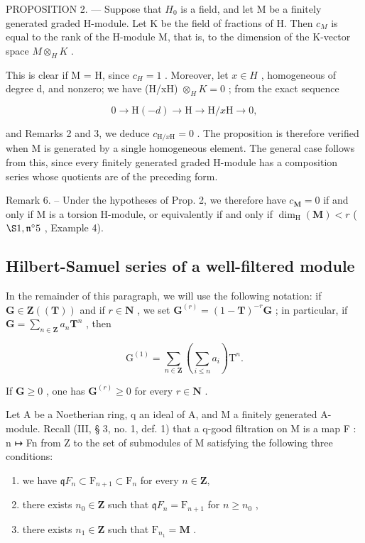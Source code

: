 PROPOSITION 2. --- Suppose that \(H_{0}\) is a field, and let M be a finitely generated graded H-module. Let K be the field of fractions of H. Then \(c_{M}\) is equal to the rank of the H-module M, that is, to the dimension of the K-vector space \(M \otimes_{H} K\) .

This is clear if M = H, since \(c_{H} = 1\) . Moreover, let \(x \in H\) , homogeneous of degree d, and nonzero; we have (H/xH) \(\otimes_{H} K = 0\) ; from the exact sequence

\[
0 \rightarrow \mathrm{H} (- d) \rightarrow \mathrm{H} \rightarrow \mathrm{H} / x \mathrm{H} \rightarrow 0,
\]

and Remarks 2 and 3, we deduce \(c_{\mathrm{H}/x\mathrm{H}}=0\) . The proposition is therefore verified when M is generated by a single homogeneous element. The general case follows from this, since every finitely generated graded H-module has a composition series whose quotients are of the preceding form.

Remark 6. -- Under the hypotheses of Prop. 2, we therefore have \(c_{\mathbf{M}} = 0\) if and only if M is a torsion H-module, or equivalently if and only if \(\dim_{\mathrm{H}}(\mathbf{M}) < r\) ( \(\S 1, \mathfrak{n}^{\circ} 5\) , Example 4).

\subsection{Hilbert-Samuel series of a well-filtered module}

In the remainder of this paragraph, we will use the following notation: if \(\mathbf{G} \in \mathbf{Z}((\mathbf{T}))\) and if \(r \in \mathbf{N}\) , we set \(\mathbf{G}^{(r)} = (1 - \mathbf{T})^{-r}\mathbf{G}\) ; in particular, if \(\mathbf{G} = \sum_{n \in \mathbf{Z}} a_n \mathbf{T}^n\) , then

\[
\mathrm{G} ^ {(1)} = \sum_ {n \in \mathbf {Z}} \left(\sum_ {i \leqslant n} a _ {i}\right) \mathrm{T} ^ {n}.
\]

If \(\mathbf{G} \geqslant 0\) , one has \(\mathbf{G}^{(r)} \geqslant 0\) for every \(r \in \mathbf{N}\) .

Let A be a Noetherian ring, q an ideal of A, and M a finitely generated A-module. Recall (III, § 3, no. 1, def. 1) that a q-good filtration on M is a map F : n ↦ Fn from Z to the set of submodules of M satisfying the following three conditions:

\begin{enumerate}
\def\labelenumi{\alph{enumi})}
\item
  we have \(\mathfrak{q}F_n\subset \mathrm{F}_{n + 1}\subset \mathrm{F}_n\) for every \(n\in \mathbf{Z},\)
\item
  there exists \(n_0 \in \mathbf{Z}\) such that \(\mathfrak{q}F_n = \mathrm{F}_{n+1}\) for \(n \geqslant n_0\) ,
\item
  there exists \(n_{1} \in \mathbf{Z}\) such that \(\mathrm{F}_{n_1} = \mathbf{M}\) .
\end{enumerate}

